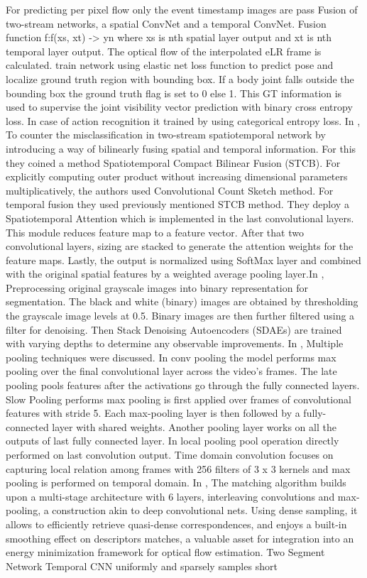 \documentclass[11pt,english]{article}
\begin{document}
For predicting  per pixel flow only the event timestamp images are pass \citep{chen2017semi} Fusion of two-stream networks, a spatial ConvNet and a temporal ConvNet. Fusion function f:f(xs, xt) -> yn where xs is nth spatial layer output and xt is nth temporal layer output. The optical flow of the interpolated eLR frame is calculated. \citep{luvizon20182d} train network using elastic net loss function to predict pose and localize ground truth region with bounding box. If a body joint falls outside the bounding box the ground truth flag is set to 0  else 1. This GT information is used to supervise the joint visibility vector prediction with binary cross entropy loss. In case of action recognition it trained by using categorical entropy loss. In \citep{wang2017spatiotemporal}, To counter the misclassification in two-stream spatiotemporal network by introducing a way of bilinearly fusing spatial and temporal information. For this they coined a method Spatiotemporal Compact Bilinear Fusion (STCB). For explicitly computing outer product without increasing dimensional parameters multiplicatively, the authors used Convolutional Count Sketch method. For temporal fusion they used previously mentioned STCB method. They deploy a Spatiotemporal Attention which is implemented in the last convolutional layers. This module reduces feature map to a feature vector. After that two convolutional layers, sizing are stacked to generate the attention weights for the feature maps. Lastly, the output is normalized using SoftMax layer and combined with the original spatial features by a weighted average pooling layer.In \citep{oyedotun2017deep}, Preprocessing original grayscale images into binary representation for segmentation. The black and white (binary) images are obtained by thresholding the grayscale image levels at 0.5. Binary images are then further filtered using a filter for denoising. Then Stack Denoising Autoencoders (SDAEs) are trained with varying depths to determine any observable improvements. In \citep{yue2015beyond},  Multiple pooling techniques were discussed. In conv pooling the model performs max pooling over the final convolutional layer across the video’s frames. The late pooling pools features after the activations go through the fully connected layers. Slow Pooling performs max pooling is first applied over frames of convolutional features with stride 5. Each max-pooling layer is then followed by a fully-connected layer with shared weights. Another pooling layer works on all the outputs of last fully connected layer. In local pooling pool operation directly performed on last convolution output. Time domain convolution focuses on capturing local relation among frames with 256 filters of 3 x 3 kernels and max pooling is performed on temporal domain. In \citep{pang2017cascade}, The matching algorithm builds upon a multi-stage architecture with 6 layers, interleaving convolutions and max-pooling, a construction akin to deep convolutional nets. Using dense sampling, it allows to efficiently retrieve quasi-dense correspondences, and enjoys a built-in smoothing effect on descriptors matches, a valuable asset for integration into an energy minimization framework for optical flow estimation. Two Segment Network \citep{wang2016temporal} Temporal CNN uniformly and sparsely samples short 
\end{document}
